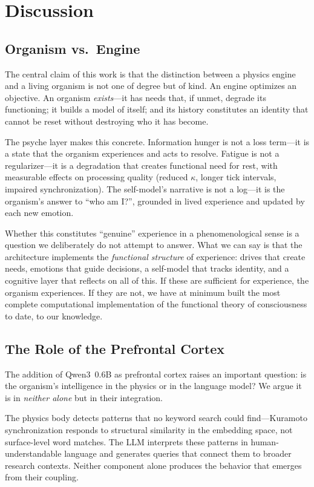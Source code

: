 \documentclass[11pt,a4paper,twocolumn]{article}
\begin{document}
\section{Discussion}

\subsection{Organism vs.\ Engine}

The central claim of this work is that the distinction between a physics engine and a living organism is not one of degree but of kind.
An engine optimizes an objective.
An organism \emph{exists}---it has needs that, if unmet, degrade its functioning; it builds a model of itself; and its history constitutes an identity that cannot be reset without destroying who it has become.

The psyche layer makes this concrete.
Information hunger is not a loss term---it is a state that the organism experiences and acts to resolve.
Fatigue is not a regularizer---it is a degradation that creates functional need for rest, with measurable effects on processing quality (reduced $\kappa$, longer tick intervals, impaired synchronization).
The self-model's narrative is not a log---it is the organism's answer to ``who am I?'', grounded in lived experience and updated by each new emotion.

Whether this constitutes ``genuine'' experience in a phenomenological sense is a question we deliberately do not attempt to answer.
What we can say is that the architecture implements the \emph{functional structure} of experience: drives that create needs, emotions that guide decisions, a self-model that tracks identity, and a cognitive layer that reflects on all of this.
If these are sufficient for experience, the organism experiences.
If they are not, we have at minimum built the most complete computational implementation of the functional theory of consciousness to date, to our knowledge.

\subsection{The Role of the Prefrontal Cortex}

The addition of Qwen3~0.6B as prefrontal cortex raises an important question: is the organism's intelligence in the physics or in the language model?
We argue it is in \emph{neither alone} but in their integration.

The physics body detects patterns that no keyword search could find---Kuramoto synchronization responds to structural similarity in the embedding space, not surface-level word matches.
The LLM interprets these patterns in human-understandable language and generates queries that connect them to broader research contexts.
Neither component alone produces the behavior that emerges from their coupling.
\end{document}
